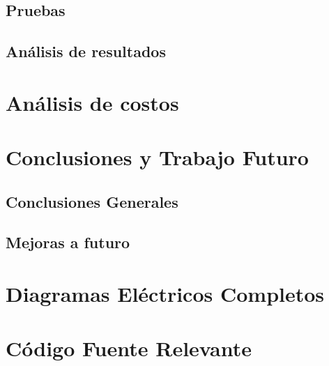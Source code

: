 \documentclass[a4paper,12pt]{report}
\begin{document}
\section{Pruebas}


\section{Análisis de resultados}




\chapter{Análisis de costos}

\chapter{Conclusiones y Trabajo Futuro}

\section{Conclusiones Generales}




\section{Mejoras a futuro}




\appendix
\chapter{Diagramas Eléctricos Completos}


\chapter{Código Fuente Relevante}

\end{document}

